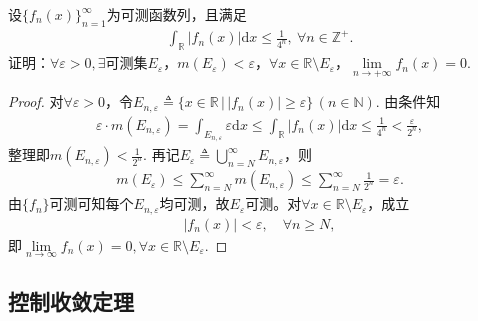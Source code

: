 \documentclass[../../main.tex]{subfiles}%
\begin{document}
\begin{example}
设$\{f_n(x)\}_{n=1}^{\infty}$为可测函数列，且满足
\begin{align*}
\int_{\mathbb{R}} |f_n(x)| \mathrm{d}x \leqslant \frac{1}{4^n},\ \forall n\in \mathbb{Z}^+.
\end{align*}
证明：$\forall \varepsilon>0,\exists$可测集$E_\varepsilon$，$m(E_\varepsilon)<\varepsilon$，$\forall x\in \mathbb{R}\setminus E_\varepsilon$，$\lim\limits_{n\to+\infty} f_n(x)=0.$
\end{example}
\begin{proof}
对$\forall \varepsilon>0$，令$E_{n,\varepsilon}\triangleq \big\{x\in\mathbb{R}\,\big|\,|f_n(x)|\geqslant \varepsilon\big\}\,(n\in\mathbb{N}).$
由条件知
\begin{align*}
\varepsilon\cdot m(E_{n,\varepsilon})=\int_{E_{n,\varepsilon}} \varepsilon \mathrm{d}x \leqslant \int_{\mathbb{R}} |f_n(x)|\mathrm{d}x \leqslant \frac{1}{4^n}<\frac{\varepsilon}{2^n},
\end{align*}
整理即$m(E_{n,\varepsilon})<\frac{1}{2^n}.$
再记$E_\varepsilon\triangleq \bigcup\limits_{n=N}^{\infty}E_{n,\varepsilon}$，则
\begin{align*}
m(E_\varepsilon)\leqslant \sum\limits_{n=N}^{\infty}m(E_{n,\varepsilon})\leqslant \sum\limits_{n=N}^{\infty}\frac{1}{2^n}=\varepsilon.
\end{align*}
由$\{f_n\}$可测可知每个$E_{n,\varepsilon}$均可测，故$E_\varepsilon$可测。对$\forall x\in \mathbb{R}\setminus E_\varepsilon$，成立
\begin{align*}
|f_n(x)|<\varepsilon,\quad \forall n\geqslant N,
\end{align*}
即$\lim\limits_{n\to\infty} f_n(x)=0,\forall x\in \mathbb{R}\setminus E_\varepsilon.$\end{proof}



\subsection{控制收敛定理}
\end{document}
